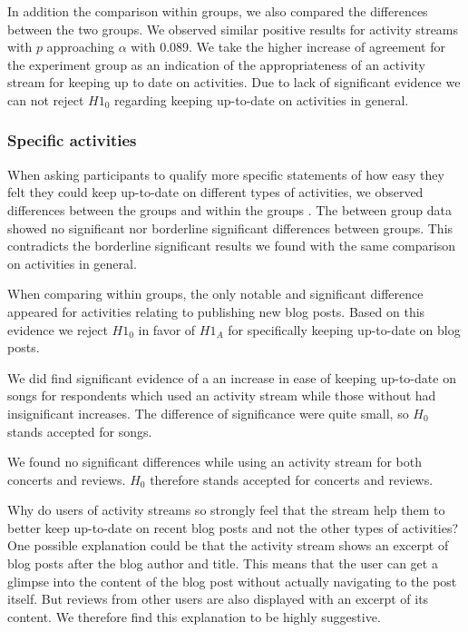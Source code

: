 In addition the comparison within
groups, we also compared the differences between the two groups. We observed
similar positive results for activity streams with $p$ approaching $\alpha$
with 0.089.
We take the higher increase of agreement for the experiment
group as an indication of the appropriateness of an activity stream for keeping
up to date on activities.
Due to lack of significant evidence we
can not reject $H1_0$ regarding keeping up-to-date on activities in general.

\subsubsection{Specific activities}

When asking participants to qualify more specific statements of how
easy they felt they could keep up-to-date on different types of activities,
we observed differences between%
the groups and within the groups%
.
The between group data showed no significant nor borderline significant
differences between groups. This contradicts the borderline significant
results we found with the same comparison on activities in general.

When comparing within groups, the only notable and significant difference
appeared for activities relating to publishing new blog posts.
Based on this evidence we reject $H1_0$ in favor
of $H1_A$ for specifically keeping up-to-date on blog posts.

We did find significant evidence
of a an increase in ease of keeping up-to-date on songs for respondents
which used an activity stream while those without had insignificant
increases. The difference of significance were quite small, so $H_0$
stands accepted for songs.

We found no significant differences while using an activity stream
for both concerts and reviews. $H_0$ therefore stands accepted for concerts
and reviews.

Why do users of activity streams so strongly feel that the stream help them to
better keep up-to-date on recent blog posts and not the other types of
activities? One possible explanation could be that the activity stream
shows an excerpt of blog posts after the blog author and title.%
This means
that the user can get a glimpse into the content of the blog post without
actually navigating to the post itself.
But reviews from other users are also displayed with an excerpt of its
content. We therefore find this explanation to be highly suggestive.

